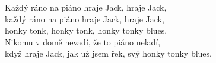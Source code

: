 	\nv{}Každý ráno na piáno hraje Jack, hraje Jack,\\
	každý ráno na piáno hraje Jack, hraje Jack,\\
	honky tonk, honky tonk, honky tonky blues.\\
	Nikomu v domě nevadí, že to piáno neladí,\\
	když hraje Jack, jak už jsem řek, svý honky tonky blues.

\newpage
